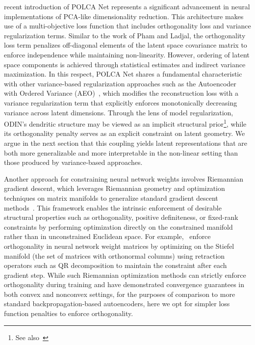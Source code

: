 \documentclass[twoside,11pt]{article}
\begin{document}
\cite{perozo2024principal} recent introduction of POLCA Net represents a significant advancement in neural implementations of PCA-like dimensionality reduction. This architecture makes use of a multi-objective loss function that includes orthogonality loss and variance regularization terms. Similar to the work of Pham and Ladjal, the orthogonality loss term penalizes off-diagonal elements of the latent space covariance matrix to enforce independence while maintaining non-linearity. However, ordering of latent space components is achieved through statistical estimates and indirect variance maximization. In this respect, POLCA Net shares a fundamental characteristic with other variance-based regularization approaches such as the Autoencoder with Ordered Variance (AEO)~\cite{augustine2024autoencoder}, which modifies the reconstruction loss with a variance regularization term that explicitly enforces monotonically decreasing variance across latent dimensions. Through the lens of model regularization, ODIN's dendritic structure may be viewed as an implicit structural prior\footnote{See also~\cite{chen2024compressing}}, while its orthogonality penalty serves as an explicit constraint on latent geometry. We argue in the next section that this coupling yields latent representations that are both more generalizable and more interpretable in the non-linear setting than those produced by variance-based approaches.

Another approach for constraining neural network weights involves Riemannian gradient descent, which leverages Riemannian geometry and optimization techniques on matrix manifolds to generalize standard gradient descent methods~\cite{harandi2016generalized,fei2025survey}. This framework enables the intrinsic enforcement of desirable structural properties such as orthogonality, positive definiteness, or fixed-rank constraints by performing optimization directly on the constrained manifold rather than in unconstrained Euclidean space. For example,~\cite{harandi2016generalized} enforce orthogonality in neural network weight matrices by optimizing on the Stiefel manifold (the set of matrices with orthonormal columns) using retraction operators such as QR decomposition to maintain the constraint after each gradient step. While such Riemannian optimization methods can strictly enforce orthogonality during training and have demonstrated convergence guarantees in both convex and nonconvex settings, for the purposes of comparison to more standard backpropagation-based autoencoders, here we opt for simpler loss function penalties to enforce orthogonality.
\end{document}
